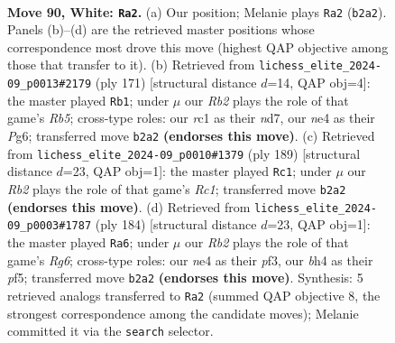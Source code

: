\documentclass[11pt]{article}
\begin{document}
\clearpage

\begin{figure}[p]\centering
\begin{subfigure}{0.46\textwidth}\centering
\resizebox{\linewidth}{!}{%
\newchessgame
\chessboard[
  setfen={8/8/4k2p/3pp3/1K2n2b/8/1R6/2r5 w - - 4 90},
  showmover=false,
  pgfstyle=straightmove, color=movearrow, markmove={b2-a2}
]}
\caption{}
\end{subfigure}\hfill
\begin{subfigure}{0.46\textwidth}\centering
\resizebox{\linewidth}{!}{%
\newchessgame
\chessboard[
  setfen={8/3N4/6p1/P5P1/1r1k3P/5PK1/8/8 b - - 1 86},
  showmover=false,
  pgfstyle=straightmove, color=movearrow, markmove={b4-b1}
]}
\caption{}
\end{subfigure}
\\[4pt]
\begin{subfigure}{0.46\textwidth}\centering
\resizebox{\linewidth}{!}{%
\newchessgame
\chessboard[
  setfen={2r5/8/4k3/1R6/6KP/5P2/8/8 b - - 2 95},
  showmover=false,
  pgfstyle=straightmove, color=movearrow, markmove={c8-c1}
]}
\caption{}
\end{subfigure}\hfill
\begin{subfigure}{0.46\textwidth}\centering
\resizebox{\linewidth}{!}{%
\newchessgame
\chessboard[
  setfen={8/8/6R1/5p2/5k2/5p2/1r6/4K3 w - - 42 93},
  showmover=false,
  pgfstyle=straightmove, color=movearrow, markmove={g6-a6}
]}
\caption{}
\end{subfigure}
\caption{\textbf{Move 90, White: \texttt{Ra2}.} (a) Our position; Melanie plays \texttt{Ra2} (\texttt{b2a2}). Panels (b)--(d) are the retrieved master positions whose correspondence most drove this move (highest QAP objective among those that transfer to it). (b) Retrieved from \texttt{lichess\_elite\_2024-09\_p0013\#2179} (ply 171) [structural distance $d$=14, QAP obj=4]: the master played \texttt{Rb1}; under $\mu$ our \emph{Rb2} plays the role of that game's \emph{Rb5}; cross-type roles: our \emph{r}c1 as their \emph{n}d7, our \emph{n}e4 as their \emph{P}g6; transferred move \texttt{b2a2} \textbf{(endorses this move)}. (c) Retrieved from \texttt{lichess\_elite\_2024-09\_p0010\#1379} (ply 189) [structural distance $d$=23, QAP obj=1]: the master played \texttt{Rc1}; under $\mu$ our \emph{Rb2} plays the role of that game's \emph{Rc1}; transferred move \texttt{b2a2} \textbf{(endorses this move)}. (d) Retrieved from \texttt{lichess\_elite\_2024-09\_p0003\#1787} (ply 184) [structural distance $d$=23, QAP obj=1]: the master played \texttt{Ra6}; under $\mu$ our \emph{Rb2} plays the role of that game's \emph{Rg6}; cross-type roles: our \emph{n}e4 as their \emph{p}f3, our \emph{b}h4 as their \emph{p}f5; transferred move \texttt{b2a2} \textbf{(endorses this move)}. Synthesis: 5 retrieved analogs transferred to \texttt{Ra2} (summed QAP objective 8, the strongest correspondence among the candidate moves); Melanie committed it via the \texttt{search} selector.}
\label{fig:thought-m178}
\end{figure}
\end{document}

